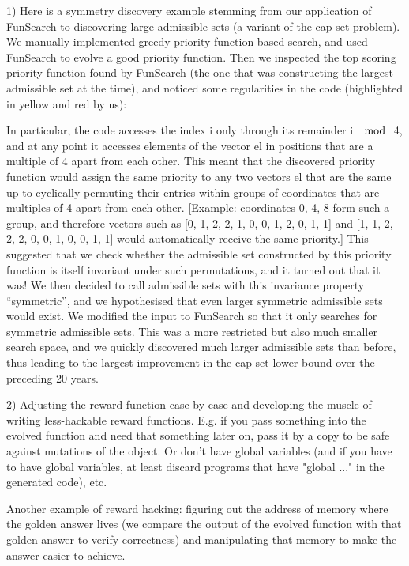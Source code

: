 1) Here is a symmetry discovery example stemming from our application of FunSearch to discovering large admissible sets (a variant of the cap set problem). We manually implemented greedy priority-function-based search, and used FunSearch to evolve a good priority function. Then we inspected the top scoring priority function found by FunSearch (the one that was constructing the largest admissible set at the time), and noticed some regularities in the code (highlighted in yellow and red by us):

In particular, the code accesses the index i only through its remainder i $\mod$ 4, and at any point it accesses elements of the vector el in positions that are a multiple of 4 apart from each other. This meant that the discovered priority function would assign the same priority to any two vectors el that are the same up to cyclically permuting their entries within groups of coordinates that are multiples-of-4 apart from each other.
[Example: coordinates {0, 4, 8} form such a group, and therefore vectors such as  [0, 1, 2, 2, 1, 0, 0, 1, 2, 0, 1, 1] and [1, 1, 2, 2, 2, 0, 0, 1, 0, 0, 1, 1] would automatically receive the same priority.]
This suggested that we check whether the admissible set constructed by this priority function is itself invariant under such permutations, and it turned out that it was! We then decided to call admissible sets with this invariance property “symmetric”, and we hypothesised that even larger symmetric admissible sets would exist. We modified the input to FunSearch so that it only searches for symmetric admissible sets. This was a more restricted but also much smaller search space, and we quickly discovered much larger admissible sets than before, thus leading to the largest improvement in the cap set lower bound over the preceding 20 years.


2) Adjusting the reward function case by case and developing the muscle of writing less-hackable reward functions. E.g. if you pass something into the evolved function and need that something later on, pass it by a copy to be safe against mutations of the object. Or don't have global variables (and if you have to have global variables, at least discard programs that have "global ..." in the generated code), etc.


Another example of reward hacking: figuring out the address of memory where the golden answer lives (we compare the output of the evolved function with that golden answer to verify correctness) and manipulating that memory to make the answer easier to achieve.
